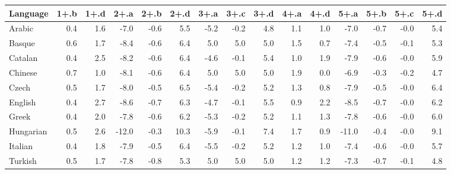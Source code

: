 \begin{tabular}{lrrrrrrrrrrrrrr}
\toprule
 Language   &   1+.b &   1+.d &   2+.a &   2+.b &   2+.d &   3+.a &   3+.c &   3+.d &   4+.a &   4+.d &   5+.a &   5+.b &   5+.c &   5+.d \\
\midrule
 Arabic     &    0.4 &    1.6 &   -7.0 &   -0.6 &    5.5 &   -5.2 &   -0.2 &    4.8 &    1.1 &    1.0 &   -7.0 &   -0.7 &   -0.0 &    5.4 \\
 Basque     &    0.6 &    1.7 &   -8.4 &   -0.6 &    6.4 &    5.0 &    5.0 &    5.0 &    1.5 &    0.7 &   -7.4 &   -0.5 &   -0.1 &    5.3 \\
 Catalan    &    0.4 &    2.5 &   -8.2 &   -0.6 &    6.4 &   -4.6 &   -0.1 &    5.4 &    1.0 &    1.9 &   -7.9 &   -0.6 &   -0.0 &    5.9 \\
 Chinese    &    0.7 &    1.0 &   -8.1 &   -0.6 &    6.4 &    5.0 &    5.0 &    5.0 &    1.9 &    0.0 &   -6.9 &   -0.3 &   -0.2 &    4.7 \\
 Czech      &    0.5 &    1.7 &   -8.0 &   -0.5 &    6.5 &   -5.4 &   -0.2 &    5.2 &    1.3 &    0.8 &   -7.9 &   -0.5 &   -0.0 &    6.4 \\
 English    &    0.4 &    2.7 &   -8.6 &   -0.7 &    6.3 &   -4.7 &   -0.1 &    5.5 &    0.9 &    2.2 &   -8.5 &   -0.7 &   -0.0 &    6.2 \\
 Greek      &    0.4 &    2.0 &   -7.8 &   -0.6 &    6.2 &   -5.3 &   -0.2 &    5.2 &    1.1 &    1.3 &   -7.8 &   -0.6 &   -0.0 &    6.0 \\
 Hungarian  &    0.5 &    2.6 &  -12.0 &   -0.3 &   10.3 &   -5.9 &   -0.1 &    7.4 &    1.7 &    0.9 &  -11.0 &   -0.4 &   -0.0 &    9.1 \\
 Italian    &    0.4 &    1.8 &   -7.9 &   -0.5 &    6.4 &   -5.5 &   -0.2 &    5.2 &    1.2 &    1.0 &   -7.4 &   -0.6 &   -0.0 &    5.7 \\
 Turkish    &    0.5 &    1.7 &   -7.8 &   -0.8 &    5.3 &    5.0 &    5.0 &    5.0 &    1.2 &    1.2 &   -7.3 &   -0.7 &   -0.1 &    4.8 \\
\bottomrule
\end{tabular}